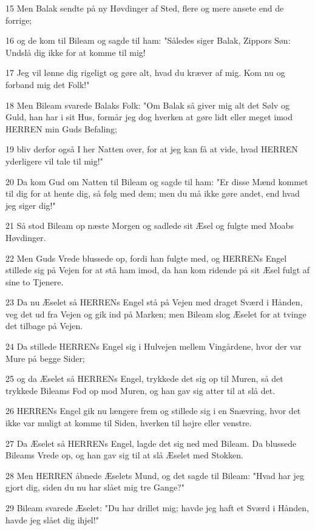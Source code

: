 \par 15 Men Balak sendte på ny Høvdinger af Sted, flere og mere ansete end de forrige;
\par 16 og de kom til Bileam og sagde til ham: "Således siger Balak, Zippors Søn: Undslå dig ikke for at komme til mig!
\par 17 Jeg vil lønne dig rigeligt og gøre alt, hvad du kræver af mig. Kom nu og forband mig det Folk!"
\par 18 Men Bileam svarede Balaks Folk: "Om Balak så giver mig alt det Sølv og Guld, han har i sit Hus, formår jeg dog hverken at gøre lidt eller meget imod HERREN min Guds Befaling;
\par 19 bliv derfor også I her Natten over, for at jeg kan få at vide, hvad HERREN yderligere vil tale til mig!"
\par 20 Da kom Gud om Natten til Bileam og sagde til ham: "Er disse Mænd kommet til dig for at hente dig, så følg med dem; men du må ikke gøre andet, end hvad jeg siger dig!"
\par 21 Så stod Bileam op næste Morgen og sadlede sit Æsel og fulgte med Moabs Høvdinger.
\par 22 Men Guds Vrede blussede op, fordi han fulgte med, og HERRENs Engel stillede sig på Vejen for at stå ham imod, da han kom ridende på sit Æsel fulgt af sine to Tjenere.
\par 23 Da nu Æselet så HERRENs Engel stå på Vejen med draget Sværd i Hånden, veg det ud fra Vejen og gik ind på Marken; men Bileam slog Æselet for at tvinge det tilbage på Vejen.
\par 24 Da stillede HERRENs Engel sig i Hulvejen mellem Vingårdene, hvor der var Mure på begge Sider;
\par 25 og da Æselet så HERRENs Engel, trykkede det sig op til Muren, så det trykkede Bileams Fod op mod Muren, og han gav sig atter til at slå det.
\par 26 HERRENs Engel gik nu længere frem og stillede sig i en Snævring, hvor det ikke var muligt at komme til Siden, hverken til højre eller venstre.
\par 27 Da Æselet så HERRENs Engel, lagde det sig ned med Bileam. Da blussede Bileams Vrede op, og han gav sig til at slå Æselet med Stokken.
\par 28 Men HERREN åbnede Æselets Mund, og det sagde til Bileam: "Hvad har jeg gjort dig, siden du nu har slået mig tre Gange?"
\par 29 Bileam svarede Æselet: "Du har drillet mig; havde jeg haft et Sværd i Hånden, havde jeg slået dig ihjel!"
